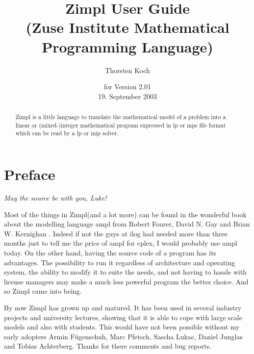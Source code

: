 \documentclass[12pt]{article}
\newcommand{\zimpl}{{\sc Zimpl}\xspace}
\newcommand{\lp}{{\sc lp}\xspace}
\newcommand{\mip}{{\sc mip}\xspace}
\newcommand{\mps}{{\sc mps}\xspace}
\newcommand{\lpf}{{\sc lp}\xspace}
\newcommand{\ampl}{{\sc ampl}\xspace}
\newcommand{\ilog}{{\sc ilog}\xspace}
\newcommand{\cplex}{{\sc cplex}\xspace}
\begin{document}

\title{
\LARGE\zimpl User Guide\\
\normalsize (Zuse Institute Mathematical Programming Language)}
\author{Thorsten Koch}
\date{\small for Version 2.01\\19. September 2003}
\maketitle
\vfill
\tableofcontents
\newpage
\begin{abstract}
\zimpl is a little language to translate the mathematical model of a 
problem into a linear or (mixed-)integer mathematical program
expressed in \lpf or \mps file format which can be read
by a \lp or \mip solver.
\end{abstract}
\section{Preface}
\begin{flushright}
{\em May the source be with you, Luke!}
\end{flushright}
Most of the things in \zimpl (and a lot more) can be found in 
the wonderful book about the modelling language \ampl 
from Robert Fourer, David N. Gay and Brian W. Kernighan
\cite{FourierGrayKernighan2003}.
Indeed if not the guys at \ilog had needed more than three months just
to tell me the price of \ampl for \cplex, I would probably use
\ampl today.
On the other hand, having the source code of a program has its advantages. The
possibility to run it regardless of architecture and operating system, the
ability to modify it to suite the needs, and not having to hassle with license
managers may make a much less powerful program the better choice.
And so \zimpl came into being.

\bigskip
By now \zimpl has grown up and matured. It has been used in several
industry projects and university lectures, showing that it is able to
cope with large scale models and also with students.
This would have not been possible without my early adopters 
Armin F\"ugenschuh, Marc Pfetsch, Sascha Lukac, Daniel Junglas
and Tobias Achterberg. Thanks for there comments and bug reports.
\end{document}
